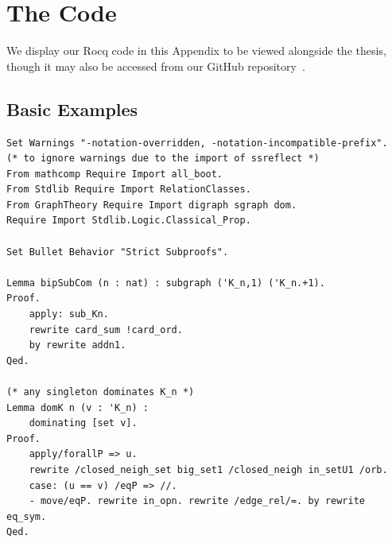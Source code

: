\chapter{The Code}
\label{AppendixB}
We display our Rocq code in this Appendix to be viewed alongside the thesis, though it may also be accessed from our GitHub repository~\cite{my_code}. 
\section{Basic Examples}\label{apdx:basic}
\begin{verbatim}
Set Warnings "-notation-overridden, -notation-incompatible-prefix".
(* to ignore warnings due to the import of ssreflect *)
From mathcomp Require Import all_boot.
From Stdlib Require Import RelationClasses.
From GraphTheory Require Import digraph sgraph dom.
Require Import Stdlib.Logic.Classical_Prop.

Set Bullet Behavior "Strict Subproofs".

Lemma bipSubCom (n : nat) : subgraph ('K_n,1) ('K_n.+1).
Proof. 
    apply: sub_Kn.
    rewrite card_sum !card_ord. 
    by rewrite addn1.
Qed.

(* any singleton dominates K_n *)
Lemma domK n (v : 'K_n) :
    dominating [set v].
Proof.
    apply/forallP => u.
    rewrite /closed_neigh_set big_set1 /closed_neigh in_setU1 /orb.
    case: (u == v) /eqP => //.
    - move/eqP. rewrite in_opn. rewrite /edge_rel/=. by rewrite eq_sym.
Qed.
\end{verbatim}

